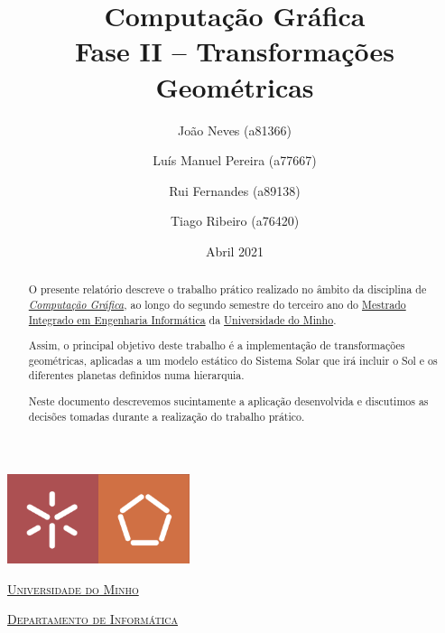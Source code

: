 \documentclass[a4paper, 11pt]{article}
\title{Computação Gráfica \\ \Large Fase II -- Transformações Geométricas}
\author{João Neves (a81366) \and Luís Manuel Pereira (a77667) \and Rui Fernandes (a89138)
\and Tiago Ribeiro (a76420)}
\date{Abril 2021}
\begin{document}
\begin{titlepage}
    \begin{center}
        \begin{minipage}{.75\linewidth}
            \centering
            \includegraphics[width=0.4\textwidth]{img/EEUM.png}\par\vspace{1cm}
            \vspace{1.5cm}
            \href{https://www.uminho.pt/PT}{\scshape\LARGE Universidade do Minho} \par
            \vspace{1cm}
            \href{https://www.di.uminho.pt/}{\scshape\Large Departamento de Informática} \par
            \vspace{1.5cm}
            \maketitle
        \end{minipage}
    \end{center}
    \vspace{2cm}
    \thispagestyle{empty}
    \clearpage
\end{titlepage}


\begin{abstract}
O presente relatório descreve o trabalho prático realizado no âmbito da disciplina de
\href{https://miei.di.uminho.pt/plano_estudos.html#computa_o_gr_fica}
{\emph{Computação Gráfica}}, ao longo do segundo semestre
do terceiro ano do \href{http://miei.di.uminho.pt}{Mestrado Integrado em Engenharia Informática}
da \href{https://www.uminho.pt}{Universidade do Minho}.

Assim, o principal objetivo deste trabalho é a implementação de transformações geométricas,
aplicadas a um modelo estático do Sistema Solar que irá incluir o Sol e os diferentes planetas
definidos numa hierarquia.

Neste documento descrevemos sucintamente a aplicação desenvolvida e discutimos as
decisões tomadas durante a realização do trabalho prático.
\end{abstract}
\end{document}
